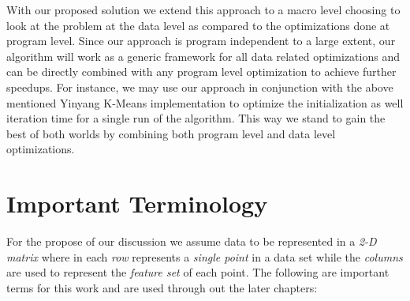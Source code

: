 With our proposed solution we extend this approach to a macro level choosing to look at the problem at the data level as compared to the optimizations done at program level. Since our approach is program independent to a large extent, our algorithm will work as a generic framework for all data related optimizations and can be directly combined with any program level optimization to achieve further speedups. For instance, we may use our approach in conjunction with the above mentioned Yinyang K-Means implementation to optimize the initialization as well iteration time for a single run of the algorithm. This way we stand to gain the best of both worlds by combining both program level and data level optimizations.


\section{Important Terminology}
For the propose of our discussion we assume data to be represented in a \textit{2-D matrix} where in each \textit{row} represents a \textit{single point} in a data set while the \textit{columns} are used to represent the \textit{feature set} of each point.
The following are important terms for this work and are used through out the later chapters:
